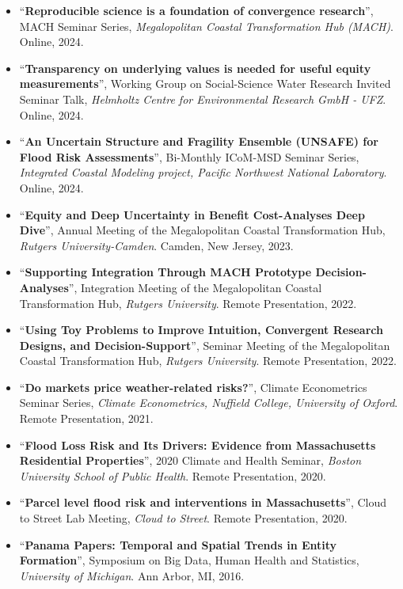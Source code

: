 \documentclass[10pt,oneside]{article}
\begin{document}
\begin{itemize}[label={}]
  
  \item \enquote{\textbf{Reproducible science is a foundation of convergence research}}, MACH Seminar Series,  \textit{Megalopolitan Coastal Transformation Hub (MACH)}. Online, 2024.
  
  \item \enquote{\textbf{Transparency on underlying values is needed for useful equity measurements}}, Working Group on Social-Science Water Research Invited Seminar Talk,  \textit{Helmholtz Centre for Environmental Research GmbH - UFZ}. Online, 2024.
  
  \item \enquote{\textbf{An Uncertain Structure and Fragility Ensemble (UNSAFE) for Flood Risk Assessments}}, Bi-Monthly ICoM-MSD Seminar Series,  \textit{Integrated Coastal Modeling project, Pacific Northwest National Laboratory}. Online, 2024.
  
  \item \enquote{\textbf{Equity and Deep Uncertainty in Benefit Cost-Analyses Deep Dive}}, Annual Meeting of the Megalopolitan Coastal Transformation Hub,  \textit{Rutgers University-Camden}. Camden, New Jersey, 2023.
  
  \item \enquote{\textbf{Supporting Integration Through MACH Prototype Decision-Analyses}}, Integration Meeting of the Megalopolitan Coastal Transformation Hub,  \textit{Rutgers University}. Remote Presentation, 2022.
  
  \item \enquote{\textbf{Using Toy Problems to Improve Intuition, Convergent Research Designs, and Decision-Support}}, Seminar Meeting of the Megalopolitan Coastal Transformation Hub,  \textit{Rutgers University}. Remote Presentation, 2022.
  
  \item \enquote{\textbf{Do markets price weather-related risks?}}, Climate Econometrics Seminar Series,  \textit{Climate Econometrics, Nuffield College, University of Oxford}. Remote Presentation, 2021.
  
  \item \enquote{\textbf{Flood Loss Risk and Its Drivers: Evidence from Massachusetts Residential Properties}}, 2020 Climate and Health Seminar,  \textit{Boston University School of Public Health}. Remote Presentation, 2020.
  
  \item \enquote{\textbf{Parcel level flood risk and interventions in Massachusetts}}, Cloud to Street Lab Meeting,  \textit{Cloud to Street}. Remote Presentation, 2020.
  
  \item \enquote{\textbf{Panama Papers: Temporal and Spatial Trends in Entity Formation}}, Symposium on Big Data, Human Health and Statistics,  \textit{University of Michigan}. Ann Arbor, MI, 2016.
  
\end{itemize}
\end{document}
